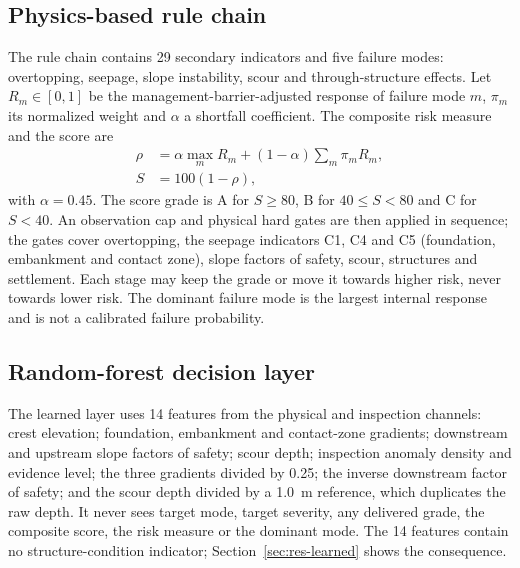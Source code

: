 \documentclass[journal]{IEEEtran}
\begin{document}
\subsection{Physics-based rule chain}
\label{sec:rule}
The rule chain contains 29 secondary indicators and five failure modes: overtopping, seepage, slope instability, scour and through-structure effects. Let $R_m\in[0,1]$ be the management-barrier-adjusted response of failure mode $m$, $\pi_m$ its normalized weight and $\alpha$ a shortfall coefficient. The composite risk measure and the score are
\begin{align}
\rho&=\alpha\max_m R_m+(1-\alpha)\sum_m \pi_m R_m, \label{eq:risk}\\
S&=100(1-\rho), \label{eq:score}
\end{align}
with $\alpha=0.45$. The score grade is A for $S\geq80$, B for $40\leq S<80$ and C for $S<40$. An observation cap and physical hard gates are then applied in sequence; the gates cover overtopping, the seepage indicators C1, C4 and C5 (foundation, embankment and contact zone), slope factors of safety, scour, structures and settlement. Each stage may keep the grade or move it towards higher risk, never towards lower risk. The dominant failure mode is the largest internal response and is not a calibrated failure probability.

\subsection{Random-forest decision layer}
\label{sec:learner}
The learned layer uses 14 features from the physical and inspection channels: crest elevation; foundation, embankment and contact-zone gradients; downstream and upstream slope factors of safety; scour depth; inspection anomaly density and evidence level; the three gradients divided by 0.25; the inverse downstream factor of safety; and the scour depth divided by a 1.0~m reference, which duplicates the raw depth. It never sees target mode, target severity, any delivered grade, the composite score, the risk measure or the dominant mode. The 14 features contain no structure-condition indicator; Section~\ref{sec:res-learned} shows the consequence.
\end{document}

